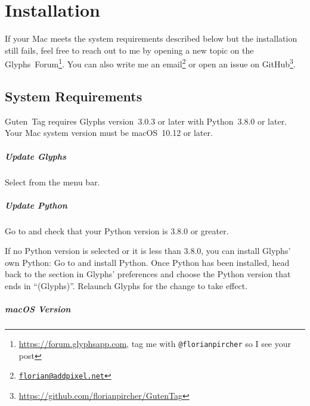 \chapter{Installation}%
\label{cha:installation}

If your Mac meets the system requirements described below but the installation still fails, feel free to reach out to me by opening a new topic on the Glyphs~Forum\footnote{\url{https://forum.glyphsapp.com}, tag me with \texttt{@florianpircher} so I see your post}.
You can also write me an email\footnote{\texttt{\href{mailto:florian@addpixel.net}{florian@addpixel.net}}} or open an issue on GitHub\footnote{\url{https://github.com/florianpircher/GutenTag}}.

\section{System Requirements}%
\label{sec:system_requirements}

Guten~Tag requires Glyphs version~3.0.3 or later with Python~3.8.0 or later.
Your Mac system version must be macOS~10.12 or later.

\paragraph{Update Glyphs}%
\label{par:update_glyphs}

Select  from the menu bar.

\medbreak\noindent{}

\paragraph{Update Python}%
\label{par:update_python}

Go to  and check that your Python version is 3.8.0 or greater.

If no Python version is selected or it is less than 3.8.0, you can install Glyphs’ own Python:
Go to  and install Python.
Once Python has been installed, head back to the  section in Glyphs’ preferences and choose the Python version that ends in \enquote{(Glyphs)}.
Relaunch Glyphs for the change to take effect.

\paragraph{macOS Version}%
\label{par:macos_version}

